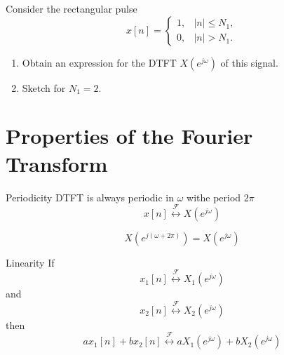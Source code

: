 \begin{frame}
    {
        \begin{figure}
            \centering
            
        \end{figure}

    }
\end{frame} 


\begin{frame}
    \begin{example}
        Consider the rectangular pulse
        \begin{equation*}
            x[n] = \begin{cases}
                1, & |n| \leq N_1,\\
                0, & |n| > N_1.
            \end{cases}
        \end{equation*}
        \begin{enumerate}
            \item Obtain an expression for the DTFT $X(e^{j\omega})$ of this signal.
            \item Sketch for $N_1 = 2$.
        \end{enumerate}
     \end{example}
     
        \begin{figure}
            \centering
            
        \end{figure}     
     
\end{frame}


\section{Properties of the Fourier Transform}

\begin{frame}{Periodicity}
    DTFT is always periodic in $\omega$ withe period $2\pi$
    \begin{equation*}
        x[n] \overset{\mathcal{F}}{\leftrightarrow} X(e^{j\omega})
    \end{equation*}

    \begin{equation*}
        X\left(e^{j(\omega+2\pi)}\right) = X(e^{j\omega})
    \end{equation*}
\end{frame}

\begin{frame}{Linearity}
    If
    \begin{equation*}
        x_1[n] \overset{\mathcal{F}}{\leftrightarrow} X_1(e^{j\omega})
    \end{equation*}
    and
    \begin{equation*}
        x_2[n] \overset{\mathcal{F}}{\leftrightarrow} X_2(e^{j\omega})
    \end{equation*}
    then
    \begin{equation*}
        ax_1[n] + bx_2[n] \overset{\mathcal{F}}{\leftrightarrow} aX_1(e^{j\omega}) + bX_2(e^{j\omega})
    \end{equation*}
\end{frame}

